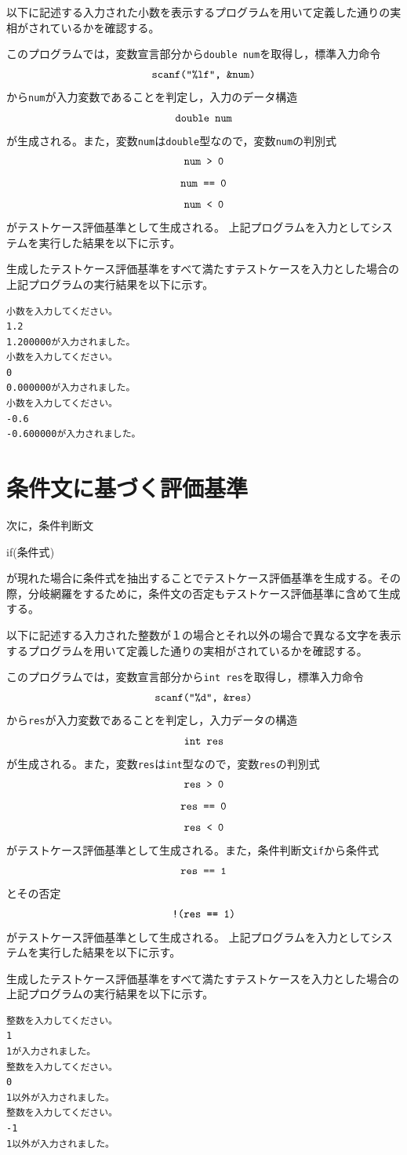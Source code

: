 \documentclass{tpu-sotu}
\begin{document}
以下に記述する入力された小数を表示するプログラムを用いて定義した通りの実相がされているかを確認する。

このプログラムでは，変数宣言部分から{\tt double num}を取得し，標準入力命令\\
\[ 
\mbox{{\tt {scanf("\%lf", \&num)}}}
\]
から{\tt num}が入力変数であることを判定し，入力のデータ構造\\
\[
\mbox{{\tt double num}}
\]
が生成される。また，変数{\tt num}は{\tt double}型なので，変数{\tt num}の判別式\\
\[ 
\mbox{\tt{num > 0}} 
\]
\[
\mbox{\tt{num == 0}}
\]
\[
\mbox{\tt{num < 0}}
\]
がテストケース評価基準として生成される。
上記プログラムを入力としてシステムを実行した結果を以下に示す。

生成したテストケース評価基準をすべて満たすテストケースを入力とした場合の上記プログラムの実行結果を以下に示す。
\begin{lstlisting}[xleftmargin=1cm]
小数を入力してください。
1.2
1.200000が入力されました。
小数を入力してください。
0
0.000000が入力されました。
小数を入力してください。
-0.6
-0.600000が入力されました。
\end{lstlisting}

\section{条件文に基づく評価基準}
次に，条件判断文\\
{\tt \centerline {if({条件式})}}
が現れた場合に条件式を抽出することでテストケース評価基準を生成する。その際，分岐網羅をするために，条件文の否定もテストケース評価基準に含めて生成する。

以下に記述する入力された整数が１の場合とそれ以外の場合で異なる文字を表示するプログラムを用いて定義した通りの実相がされているかを確認する。

このプログラムでは，変数宣言部分から{\tt int res}を取得し，標準入力命令\\
\[ 
\mbox{{\tt {scanf("\%d", \&res)}}}
\]
から{\tt res}が入力変数であることを判定し，入力データの構造\\
\[
\mbox{{\tt  int res}}
\]
が生成される。また，変数{\tt res}は{\tt int}型なので，変数{\tt res}の判別式\\
\[ 
\mbox{\tt{res > 0}} 
\]
\[
\mbox{\tt{res == 0}}
\]
\[
\mbox{\tt{res < 0}}
\]
がテストケース評価基準として生成される。また，条件判断文{\tt if}から条件式\\
\[
\mbox{\tt{res == 1}}
\]
とその否定\\
\[
\mbox{\tt{!(res == 1)}}
\]
がテストケース評価基準として生成される。
上記プログラムを入力としてシステムを実行した結果を以下に示す。

生成したテストケース評価基準をすべて満たすテストケースを入力とした場合の上記プログラムの実行結果を以下に示す。
\begin{lstlisting}[xleftmargin=1cm]
整数を入力してください。
1
1が入力されました。
整数を入力してください。
0
1以外が入力されました。
整数を入力してください。
-1
1以外が入力されました。
\end{lstlisting}
\end{document}
